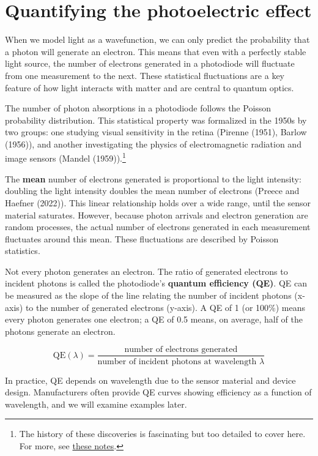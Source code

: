 \documentclass[
  letterpaper,
]{book}
\begin{document}
\section{Quantifying the photoelectric
effect}\label{quantifying-the-photoelectric-effect}

When we model light as a wavefunction, we can only predict the
probability that a photon will generate an electron. This means that
even with a perfectly stable light source, the number of electrons
generated in a photodiode will fluctuate from one measurement to the
next. These statistical fluctuations are a key feature of how light
interacts with matter and are central to quantum optics.

The number of photon absorptions in a photodiode follows the Poisson
probability distribution. This statistical property was formalized in
the 1950s by two groups: one studying visual sensitivity in the retina
(Pirenne (1951), Barlow (1956)), and another investigating the physics
of electromagnetic radiation and image sensors (Mandel
(1959)).\footnote{The history of these discoveries is fascinating but
  too detailed to cover here. For more, see
  \href{resources/Poisson-history.html}{these notes}.}

The \textbf{mean} number of electrons generated is proportional to the
light intensity: doubling the light intensity doubles the mean number of
electrons (Preece and Haefner (2022)). This linear relationship holds
over a wide range, until the sensor material saturates. However, because
photon arrivals and electron generation are random processes, the actual
number of electrons generated in each measurement fluctuates around this
mean. These fluctuations are described by Poisson statistics.

Not every photon generates an electron. The ratio of generated electrons
to incident photons is called the photodiode's \textbf{quantum
efficiency (QE)}. QE can be measured as the slope of the line relating
the number of incident photons (x-axis) to the number of generated
electrons (y-axis). A QE of 1 (or 100\%) means every photon generates
one electron; a QE of 0.5 means, on average, half of the photons
generate an electron.

\[
\mathrm{QE}(\lambda) = \frac{\text{number of electrons generated}}{\text{number of incident photons at wavelength } \lambda}
\]

In practice, QE depends on wavelength due to the sensor material and
device design. Manufacturers often provide QE curves showing efficiency
as a function of wavelength, and we will examine examples later.
\end{document}
